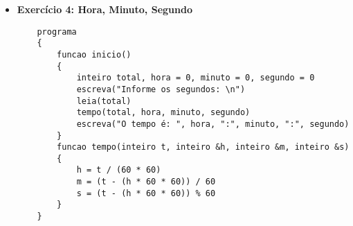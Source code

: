 \documentclass{article}
\begin{document}
\begin{itemize}
    \item \textbf{Exercício 4: Hora, Minuto, Segundo}
    \begin{lstlisting}
    programa
    {
        funcao inicio()
        {
            inteiro total, hora = 0, minuto = 0, segundo = 0
            escreva("Informe os segundos: \n")
            leia(total)
            tempo(total, hora, minuto, segundo)
            escreva("O tempo é: ", hora, ":", minuto, ":", segundo)
        }
        funcao tempo(inteiro t, inteiro &h, inteiro &m, inteiro &s)
        {
            h = t / (60 * 60)
            m = (t - (h * 60 * 60)) / 60
            s = (t - (h * 60 * 60)) % 60
        }
    }
    \end{lstlisting}
\end{itemize}
\end{document}

